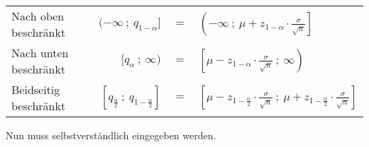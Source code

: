 \documentclass[12pt, a4paper, twoside]{scrreprt}
\begin{document}
\begin{center}
  \begin{tabular}{lrcl}
    \toprule
    Nach oben beschränkt & \((-\infty\ ;\ q_{1-\alpha}]\) & \(=\) & \(\left(-\infty\ ;\ \mu + z_{1-\alpha} \cdot \frac{\sigma}{\sqrt{n}}\right]\)\\[1em]
    Nach unten beschränkt & \([q_{\alpha}\ ;\ \infty)\) & \(=\) & \(\left[\mu - z_{1- \alpha} \cdot \frac{\sigma}{\sqrt{n}}\ ;\ \infty\right)\)\\[1em]
    Beidseitig beschränkt & \([q_{\frac{\alpha}{2}}\ ;\ q_{1-\frac{\alpha}{2}}]\) & \(=\) & \(\left[\mu - z_{1-\frac{\alpha}{2}} \cdot \frac{\sigma}{\sqrt{n}}\ ;\ \mu + z_{1-\frac{\alpha}{2}} \cdot \frac{\sigma}{\sqrt{n}}\right]\)\\[1em]
    \bottomrule
  \end{tabular}
\end{center}

Nun muss selbstverständlich  eingegeben werden.

\newpage
{}%
\addtocounter{chapter}{1}

\newpage
{}%
\addtocounter{section}{1}

\end{document}
